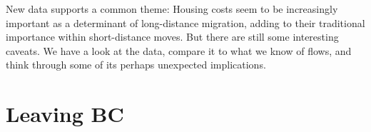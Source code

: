 \documentclass[
  letterpaper,
]{article}
\begin{document}
\begin{titlepage}
{\vspace{0pt}
}

\newcommand{\headerblock}{{\titlepageheaderblock

\vspace{1.5cm}
}}

\thispagestyle{empty} %


\newlength{\minipagewidth}
\setlength{\minipagewidth}{\textwidth}
\raggedright %
\begin{minipage}[b][\textheight][s]{\minipagewidth}
\titlepagepagealign
\headerblock

\logoblock

\titleblock

\authorblock

\abstractblock

\vfill

\dateblock
\par

\end{minipage}
\clearpage
\end{titlepage}
\setcounter{page}{1}


\pagecolor{mm_theme}
New data supports a common theme: Housing costs seem to be increasingly
important as a determinant of long-distance migration, adding to their
traditional importance within short-distance moves. But there are still
some interesting caveats. We have a look at the data, compare it to what
we know of flows, and think through some of its perhaps unexpected
implications.

\section{Leaving BC}\label{leaving-bc}
\end{document}

